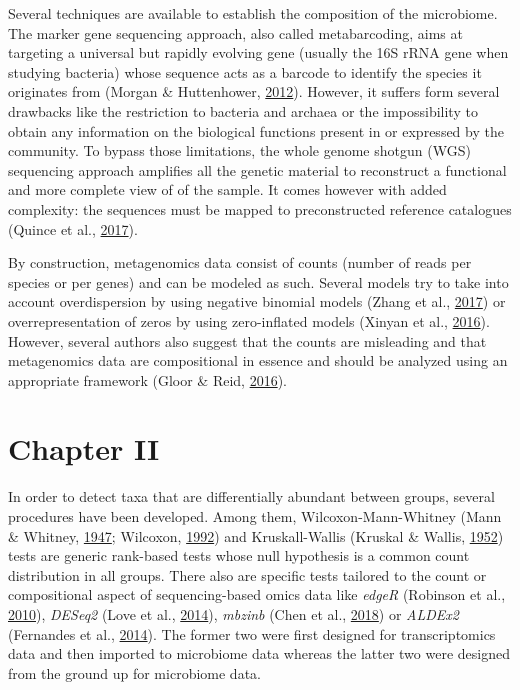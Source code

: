 \documentclass[12pt,a4paper]{reedthesis}
\theoremstyle{definition}
\theoremstyle{definition}
\theoremstyle{definition}
\theoremstyle{remark}
\begin{document}
Several techniques are available to establish the composition of the microbiome. The marker gene sequencing approach, also called metabarcoding, aims at targeting a universal but rapidly evolving gene (usually the 16S rRNA gene when studying bacteria) whose sequence acts as a barcode to identify the species it originates from (Morgan \& Huttenhower, \protect\hyperlink{ref-morgan2012human}{2012}). However, it suffers form several drawbacks like the restriction to bacteria and archaea or the impossibility to obtain any information on the biological functions present in or expressed by the community. To bypass those limitations, the whole genome shotgun (WGS) sequencing approach amplifies all the genetic material to reconstruct a functional and more complete view of of the sample. It comes however with added complexity: the sequences must be mapped to preconstructed reference catalogues (Quince et al., \protect\hyperlink{ref-quince2017shotgun}{2017}).

By construction, metagenomics data consist of counts (number of reads per species or per genes) and can be modeled as such. Several models try to take into account overdispersion by using negative binomial models (Zhang et al., \protect\hyperlink{ref-zhang2017negative}{2017}) or overrepresentation of zeros by using zero-inflated models (Xinyan et al., \protect\hyperlink{ref-xinyan2016zero}{2016}). However, several authors also suggest that the counts are misleading and that metagenomics data are compositional in essence and should be analyzed using an appropriate framework (Gloor \& Reid, \protect\hyperlink{ref-gloor2016compositional}{2016}).

\hypertarget{chapter-ii}{%
\section*{Chapter II}\label{chapter-ii}}

In order to detect taxa that are differentially abundant between groups, several procedures have been developed. Among them, Wilcoxon-Mann-Whitney (Mann \& Whitney, \protect\hyperlink{ref-mann1947test}{1947}; Wilcoxon, \protect\hyperlink{ref-wilcoxon1992individual}{1992}) and Kruskall-Wallis (Kruskal \& Wallis, \protect\hyperlink{ref-kruskal1952use}{1952}) tests are generic rank-based tests whose null hypothesis is a common count distribution in all groups. There also are specific tests tailored to the count or compositional aspect of sequencing-based omics data like \emph{edgeR} (Robinson et al., \protect\hyperlink{ref-robinson2010edger}{2010}), \emph{DESeq2} (Love et al., \protect\hyperlink{ref-love2014moderated}{2014}), \emph{mbzinb} (Chen et al., \protect\hyperlink{ref-chen2018omnibus}{2018}) or \emph{ALDEx2} (Fernandes et al., \protect\hyperlink{ref-fernandes2014unifying}{2014}). The former two were first designed for transcriptomics data and then imported to microbiome data whereas the latter two were designed from the ground up for microbiome data.
\end{document}
